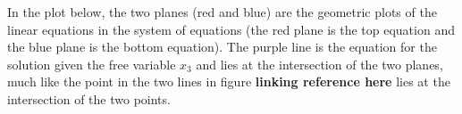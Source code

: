 \documentclass[
]{book}
\newenvironment{Shaded}{\begin{snugshade}}{\end{snugshade}}
\newcommand{\CommentTok}[1]{\textcolor[rgb]{0.56,0.35,0.01}{\textit{#1}}}
\newcommand{\DataTypeTok}[1]{\textcolor[rgb]{0.13,0.29,0.53}{#1}}
\newcommand{\DecValTok}[1]{\textcolor[rgb]{0.00,0.00,0.81}{#1}}
\newcommand{\KeywordTok}[1]{\textcolor[rgb]{0.13,0.29,0.53}{\textbf{#1}}}
\newcommand{\NormalTok}[1]{#1}
\newcommand{\OperatorTok}[1]{\textcolor[rgb]{0.81,0.36,0.00}{\textbf{#1}}}
\newcommand{\StringTok}[1]{\textcolor[rgb]{0.31,0.60,0.02}{#1}}
\theoremstyle{definition}
\theoremstyle{definition}
\theoremstyle{definition}
\theoremstyle{definition}
\theoremstyle{remark}
\begin{document}
In the plot below, the two planes (red and blue) are the geometric plots of the linear equations in the system of equations (the red plane is the top equation and the blue plane is the bottom equation). The purple line is the equation for the solution given the free variable \(x_3\) and lies at the intersection of the two planes, much like the point in the two lines in figure \textbf{linking reference here} lies at the intersection of the two points.

\begin{Shaded}
\end{Shaded}
\end{document}
